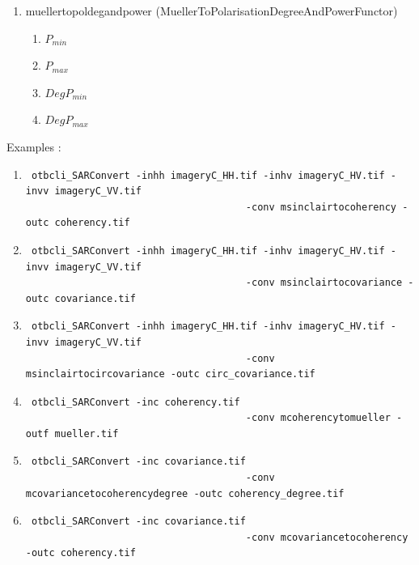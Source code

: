 \begin{enumerate}
 
\item muellertopoldegandpower (MuellerToPolarisationDegreeAndPowerFunctor)
\begin{enumerate}
\item $ P_{min} $ 
\item $ P_{max} $ 
\item $ DegP_{min} $ 
\item $ DegP_{max} $
\end{enumerate}

\end{enumerate}

Examples :

\begin{enumerate}
\item \begin{verbatim} otbcli_SARConvert -inhh imageryC_HH.tif -inhv imageryC_HV.tif -invv imageryC_VV.tif
									  -conv msinclairtocoherency -outc coherency.tif \end{verbatim}
									  
\item \begin{verbatim} otbcli_SARConvert -inhh imageryC_HH.tif -inhv imageryC_HV.tif -invv imageryC_VV.tif
									  -conv msinclairtocovariance -outc covariance.tif \end{verbatim}
									  
\item \begin{verbatim} otbcli_SARConvert -inhh imageryC_HH.tif -inhv imageryC_HV.tif -invv imageryC_VV.tif
									  -conv msinclairtocircovariance -outc circ_covariance.tif \end{verbatim}
									  
\item \begin{verbatim} otbcli_SARConvert -inc coherency.tif 
									  -conv mcoherencytomueller -outf mueller.tif \end{verbatim}
									  
\item \begin{verbatim} otbcli_SARConvert -inc covariance.tif 
									  -conv mcovariancetocoherencydegree -outc coherency_degree.tif \end{verbatim}
									  
\item \begin{verbatim} otbcli_SARConvert -inc covariance.tif 
									  -conv mcovariancetocoherency -outc coherency.tif \end{verbatim}
									  

\end{enumerate}
